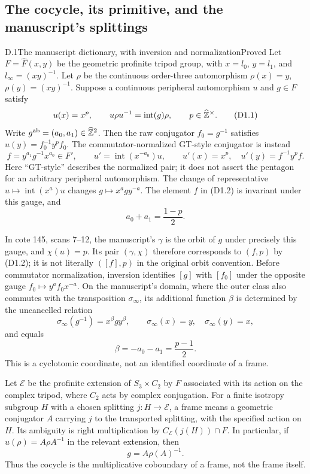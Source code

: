 \subsection{The cocycle, its primitive, and the manuscript's splittings}

\begin{statement}{D.1}{The manuscript dictionary, with inversion and normalization}{Proved}
Let $F=\widehat{F}(x,y)$ be the geometric profinite tripod group,
with $x=l_0$, $y=l_1$, and $l_\infty=(xy)^{-1}$.
Let $\rho$ be the continuous order-three automorphism
$\rho(x)=y$, $\rho(y)=(xy)^{-1}$. Suppose a continuous
peripheral automorphism $u$ and $g\in F$ satisfy
\[
 u(x)=x^p,\qquad
 u\rho u^{-1}=\operatorname{int}(g)\rho,
 \qquad p\in\widehat{\mathbb Z}^{\times}.
 \tag{D1.1}
\]
Write $g^{\rm ab}=(a_0,a_1)\in\widehat{\mathbb Z}^2$.
Then the raw conjugator $f_0=g^{-1}$ satisfies
$u(y)=f_0^{-1}y^p f_0$. The commutator-normalized
GT-style conjugator is instead
\[
 f=y^{a_1}g^{-1}x^{a_0}\in F',\qquad
 u'=\operatorname{int}(x^{-a_0})u,\qquad
 u'(x)=x^p,\quad u'(y)=f^{-1}y^p f.
 \tag{D1.2}
\]
Here ``GT-style'' describes the normalized pair;
it does not assert the pentagon for an arbitrary
peripheral automorphism.
The change of representative
$u\mapsto\operatorname{int}(x^a)u$ changes
$g\mapsto x^a g y^{-a}$. The element $f$ in
(D1.2) is invariant under this gauge, and
\[
 a_0+a_1=\frac{1-p}{2}.
 \tag{D1.3}
\]

In cote 145, scans 7--12, the manuscript's
$\gamma$ is the orbit of $g$ under precisely
this gauge, and $\chi(u)=p$. Its pair
$(\gamma,\chi)$ therefore corresponds to
$(f,p)$ by (D1.2); it is not literally
$([f],p)$ in the original orbit convention.
Before commutator normalization, inversion
identifies $[g]$ with $[f_0]$ under the opposite
gauge $f_0\mapsto y^a f_0x^{-a}$.
On the manuscript's domain, where the outer
class also commutes with the transposition
$\sigma_\infty$, its additional function $\beta$
is determined by the uncancelled relation
\[
 \sigma_\infty(g^{-1})=x^\beta g y^\beta,
 \qquad \sigma_\infty(x)=y,\quad
 \sigma_\infty(y)=x,
\]
and equals
\[
 \beta=-a_0-a_1=\frac{p-1}{2}.
 \tag{D1.4}
\]
This is a cyclotomic coordinate, not an
identified coordinate of a frame.

Let $\mathcal E$ be the profinite extension
of $S_3\times C_2$ by $F$ associated with
its action on the complex tripod, where
$C_2$ acts by complex conjugation. For a
finite isotropy subgroup $H$ with a
chosen splitting $j:H\to\mathcal E$, a frame
means a geometric conjugator $A$ carrying
$j$ to the transported splitting, with the
specified action on $H$. Its ambiguity is
right multiplication by
$C_{\mathcal E}(j(H))\cap F$. In particular,
if $u(\rho)=A\rho A^{-1}$ in the relevant
extension, then
\[
 g=A\rho(A)^{-1}.
 \tag{D1.5}
\]
Thus the cocycle is the multiplicative
coboundary of a frame, not the frame itself.


\end{statement}
